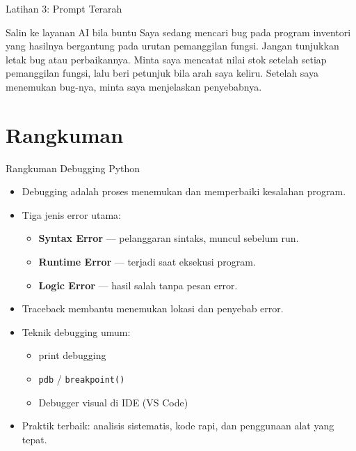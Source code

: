 \documentclass[aspectratio=169, table]{beamer}
\begin{document}
\begin{frame}{Latihan 3: Prompt Terarah}
\begin{block}{Salin ke layanan AI bila buntu}
\small Saya sedang mencari bug pada program inventori yang hasilnya bergantung pada urutan pemanggilan fungsi. Jangan tunjukkan letak bug atau perbaikannya. Minta saya mencatat nilai stok setelah setiap pemanggilan fungsi, lalu beri petunjuk bila arah saya keliru. Setelah saya menemukan bug-nya, minta saya menjelaskan penyebabnya.
\end{block}
\end{frame}

\section{Rangkuman}

\begin{frame}{Rangkuman Debugging Python}
\vspace{10pt}

\begin{itemize}
    \item Debugging adalah proses menemukan dan memperbaiki kesalahan program.
    \item Tiga jenis error utama:
    \begin{itemize}
        \item \textbf{Syntax Error} — pelanggaran sintaks, muncul sebelum run.
        \item \textbf{Runtime Error} — terjadi saat eksekusi program.
        \item \textbf{Logic Error} — hasil salah tanpa pesan error.
    \end{itemize}
    \item Traceback membantu menemukan lokasi dan penyebab error.
    \item Teknik debugging umum:
    \begin{itemize}
        \item print debugging
        \item \texttt{pdb} / \texttt{breakpoint()}
        \item Debugger visual di IDE (VS Code)
    \end{itemize}
    \item Praktik terbaik: analisis sistematis, kode rapi, dan penggunaan alat yang tepat.
\end{itemize}

\end{frame}
\end{document}
